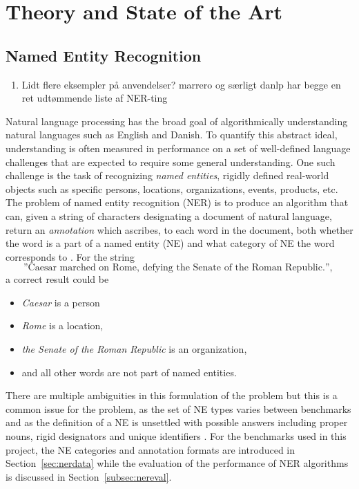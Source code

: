 \documentclass[main.tex]{subfiles}
\begin{document}
\chapter{Theory and State of the Art}
\label{chap:theory}

\section{Named Entity Recognition}
\begin{enumerate}
    \item Lidt flere eksempler på anvendelser? marrero og særligt danlp har begge en ret udtømmende liste af NER-ting
\end{enumerate}
Natural language processing has the broad goal of algorithmically understanding natural languages such as English and Danish.
To quantify this abstract ideal, understanding is often measured in performance on a set of well-defined language challenges that are expected to require some general understanding.
One such challenge is the task of recognizing \emph{named entities}, rigidly defined real-world objects such as specific persons, locations, organizations, events, products, etc.
The problem of named entity recognition (NER) is to produce an algorithm that can, given a string of characters designating a document of natural language, return an \emph{annotation} which ascribes, to each word in the document, both whether the word is a part of a named entity (NE) and what category of NE the word corresponds to \cite{wiki2021ner}.
For the string
\[
    \text{
        ''Caesar marched on Rome, defying the Senate of the Roman Republic.'',
    }
\]
a correct result could be
\begin{itemize}
    \item \emph{Caesar} is a person 
    \item \emph{Rome} is a location,
    \item \emph{the Senate of the Roman Republic} is an organization,
    \item and all other words are not part of named entities.
\end{itemize}
There are multiple ambiguities in this formulation of the problem but this is a common issue for the problem, as the set of NE types varies between benchmarks and as the definition of a NE is unsettled with possible answers including proper nouns, rigid designators and unique identifiers \cite[Sec. 4]{marrero2013ner}.
For the benchmarks used in this project, the NE categories and annotation formats are introduced in Section~\ref{sec:nerdata} while the evaluation of the performance of NER algorithms is discussed in Section~\ref{subsec:nereval}.
\end{document}
